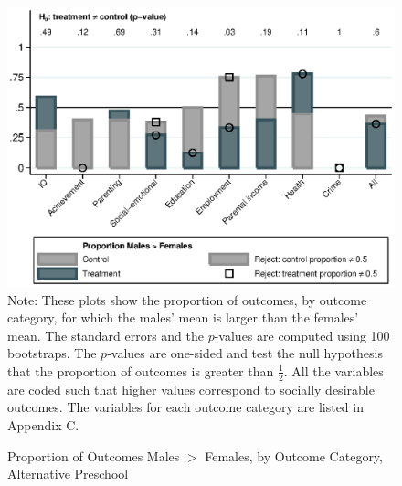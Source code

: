 \begin{figure}
\centering
\caption{Proportion of Outcomes Males $>$ Females, by Outcome Category, Alternative Preschool}
\label{fig:proportion-alt}
	\includegraphics[width=\textwidth]{output/gendergaps-treat-vs-alt}
\footnotesize \justify
Note: These plots show the proportion of outcomes, by outcome category, for which the males' mean is larger than the females' mean. The standard errors and the $p$-values are computed using 100 bootstraps. The $p$-values are one-sided and test the null hypothesis that the proportion of outcomes is greater than $\frac{1}{2}$. All the variables are coded such that higher values correspond to socially desirable outcomes. The variables for each outcome category are listed in Appendix C.
\end{figure}

